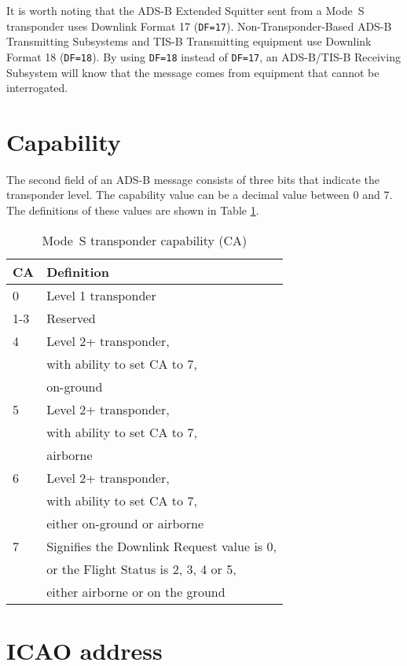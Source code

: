 It is worth noting that the ADS-B Extended Squitter sent from a Mode~S transponder uses Downlink Format 17 (\texttt{DF=17}). Non-Transponder-Based ADS-B Transmitting Subsystems and TIS-B Transmitting equipment use Downlink Format 18 (\texttt{DF=18}). By using \texttt{DF=18} instead of \texttt{DF=17}, an ADS-B/TIS-B Receiving Subsystem will know that the message comes from equipment that cannot be interrogated.

\section{Capability}

The second field of an ADS-B message consists of three bits that indicate the transponder level. The capability value can be a decimal value between 0 and 7. The definitions of these values are shown in Table \ref{tb:transponder_capability}.

\begin{table}[!ht]
\centering
\caption{Mode~S transponder capability (CA)}
\label{tb:transponder_capability}
\begin{tabular}{|l|p{8cm}|}
\hline
\textbf{CA} & \textbf{Definition} \\ \hline
0 & Level 1 transponder \\ \hline
1-3 & Reserved \\ \hline
4 & Level 2+ transponder, \\
& with ability to set CA to 7, \\ 
& on-ground \\ \hline
5 & Level 2+ transponder, \\
& with ability to set CA to 7, \\
& airborne \\ \hline
6 & Level 2+ transponder, \\ 
& with ability to set CA to 7, \\ 
& either on-ground or airborne \\ \hline
7 & Signifies the Downlink Request value is 0, \\
& or the Flight Status is 2, 3, 4 or 5, \\
& either airborne or on the ground \\ \hline
\end{tabular}
\end{table}

\section{ICAO address}

